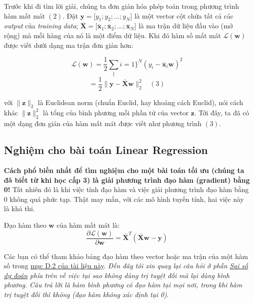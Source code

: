 Trước khi đi tìm lời giải, chúng ta đơn giản hóa phép toán trong phương
trình hàm mất mát $(2)$. Đặt
$\mathbf{y} = {[}y_1; y_2; \dots;
y_N{]}$ là một vector cột chứa tất cả các \emph{output}
của \emph{training data}; $ \mathbf{\bar{X}} =
{[}\mathbf{\bar{x}}_1; \mathbf{\bar{x}}_2; \dots; \mathbf{\bar{x}}_N
{]} $ là ma trận dữ liệu đầu vào (mở rộng) mà mỗi hàng
của nó là một điểm dữ liệu. Khi đó hàm số mất mát
$\mathcal{L}(\mathbf{w})$ được viết dưới
dạng ma trận đơn giản hơn:

\begin{equation} \mathcal{L}(\mathbf{w}) =
\frac{1}{2}\sum_\{i=1\}^N (y_i -
\mathbf{\bar{x}}_i\mathbf{w})^2 \end{equation}
\begin{equation} = \frac{1}{2} \|\mathbf{y} -
\mathbf{\bar{X}}\mathbf{w} \|_2^2
~~~~(3) \end{equation}

với $ \| \mathbf{z}\|_2 $ là Euclidean norm (chuẩn
Euclid, hay khoảng cách Euclid), nói cách khác $
\| \mathbf{z} \|_2^2
$ là tổng của bình phương mỗi phần tử của vector
$\mathbf{z}$. Tới đây, ta đã có một dạng
đơn giản của hàm mất mát được viết như phương trình
$(3)$.

\subsection{Nghiệm cho bài toán Linear
Regression}\label{nghiux1ec7m-cho-buxe0i-touxe1n-linear-regression}

\textbf{Cách phổ biến nhất để tìm nghiệm cho một bài toán tối ưu (chúng
ta đã biết từ khi học cấp 3) là giải phương trình đạo hàm (gradient)
bằng 0!} Tất nhiên đó là khi việc tính đạo hàm và việc giải phương trình
đạo hàm bằng 0 không quá phức tạp. Thật may mắn, với các mô hình tuyến
tính, hai việc này là khả thi.

Đạo hàm theo $\mathbf{w} $ của hàm mất
mát là: \begin{equation}
\frac{\partial{\mathcal{L}(\mathbf{w})}}{\partial{\mathbf{w}}} =
\mathbf{\bar{X}}^T(\mathbf{\bar{X}}\mathbf{w} - \mathbf{y})
\end{equation}

Các bạn có thể tham khảo bảng đạo hàm theo vector hoặc ma trận của một
hàm số trong
\href{https://ccrma.stanford.edu/~dattorro/matrixcalc.pdf}{mục D.2 của
tài liệu này}. \emph{Đến đây tôi xin quay lại câu hỏi ở phần
\protect\hyperlink{saiux5cux2520soux5cux2520duux5cux2520doan}{Sai số dự
đoán} phía trên về việc tại sao không dùng trị tuyệt đối mà lại dùng
bình phương. Câu trả lời là hàm bình phương có đạo hàm tại mọi nơi,
trong khi hàm trị tuyệt đối thì không (đạo hàm không xác định tại 0)}.

